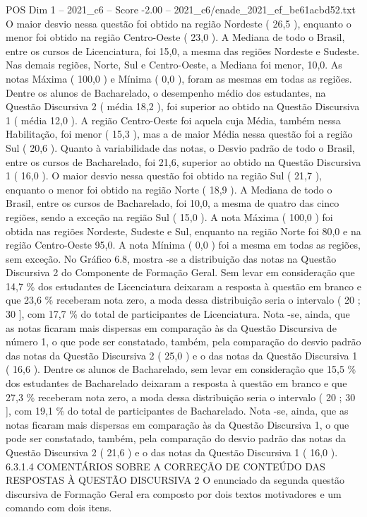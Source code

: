 \begin{textsample}{POS Dim 1 – 2021\_c6 – Score -2.00 – 2021\_c6/enade\_2021\_ef\_be61acbd52.txt}
O maior desvio nessa questão foi obtido na região Nordeste ( 26,5 ), enquanto o menor foi obtido na região Centro-Oeste ( 23,0 ).
A Mediana de todo o Brasil, entre os cursos de Licenciatura, foi 15,0, a mesma das regiões Nordeste e Sudeste.
Nas demais regiões, Norte, Sul e Centro-Oeste, a Mediana foi menor, 10,0.
As notas Máxima ( 100,0 ) e Mínima ( 0,0 ), foram as mesmas em todas as regiões.
Dentre os alunos de Bacharelado, o desempenho médio dos estudantes, na Questão Discursiva 2 ( média 18,2 ), foi superior ao obtido na Questão Discursiva 1 ( média 12,0 ).
A região Centro-Oeste foi aquela cuja Média, também nessa Habilitação, foi menor ( 15,3 ), mas a de maior Média nessa questão foi a região Sul ( 20,6 ).
Quanto à variabilidade das notas, o Desvio padrão de todo o Brasil, entre os cursos de Bacharelado, foi 21,6, superior ao obtido na Questão Discursiva 1 ( 16,0 ).
O maior desvio nessa questão foi obtido na região Sul ( 21,7 ), enquanto o menor foi obtido na região Norte ( 18,9 ).
A Mediana de todo o Brasil, entre os cursos de Bacharelado, foi 10,0, a mesma de quatro das cinco regiões, sendo a exceção na região Sul ( 15,0 ).
A nota Máxima ( 100,0 ) foi obtida nas regiões Nordeste, Sudeste e Sul, enquanto na região Norte foi 80,0 e na região Centro-Oeste 95,0.
A nota Mínima ( 0,0 ) foi a mesma em todas as regiões, sem exceção.
No Gráfico 6.8, mostra -se a distribuição das notas na Questão Discursiva 2 do Componente de Formação Geral.
Sem levar em consideração que 14,7 \% dos estudantes de Licenciatura deixaram a resposta à questão em branco e que 23,6 \% receberam nota zero, a moda dessa distribuição seria o intervalo ( 20 ; 30 ], com 17,7 \% do total de participantes de Licenciatura.
Nota -se, ainda, que as notas ficaram mais dispersas em comparação às da Questão Discursiva de número 1, o que pode ser constatado, também, pela comparação do desvio padrão das notas da Questão Discursiva 2 ( 25,0 ) e o das notas da Questão Discursiva 1 ( 16,6 ).
Dentre os alunos de Bacharelado, sem levar em consideração que 15,5 \% dos estudantes de Bacharelado deixaram a resposta à questão em branco e que 27,3 \% receberam nota zero, a moda dessa distribuição seria o intervalo ( 20 ; 30 ], com 19,1 \% do total de participantes de Bacharelado.
Nota -se, ainda, que as notas ficaram mais dispersas em comparação às da Questão Discursiva 1, o que pode ser constatado, também, pela comparação do desvio padrão das notas da Questão Discursiva 2 ( 21,6 ) e o das notas da Questão Discursiva 1 ( 16,0 ). 6.3.1.4 COMENTÁRIOS SOBRE A CORREÇÃO DE CONTEÚDO DAS RESPOSTAS À QUESTÃO DISCURSIVA 2 O enunciado da segunda questão discursiva de Formação Geral era composto por dois textos motivadores e um comando com dois itens.

\end{textsample}
